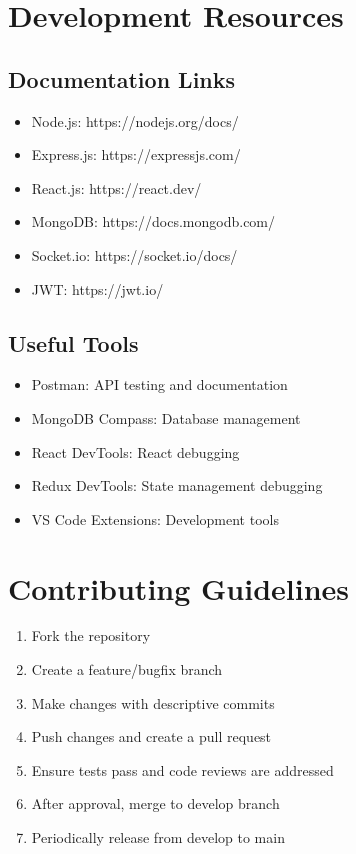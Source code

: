 \section{Development Resources}

\subsection{Documentation Links}
\begin{itemize}
    \item Node.js: https://nodejs.org/docs/
    \item Express.js: https://expressjs.com/
    \item React.js: https://react.dev/
    \item MongoDB: https://docs.mongodb.com/
    \item Socket.io: https://socket.io/docs/
    \item JWT: https://jwt.io/
\end{itemize}

\subsection{Useful Tools}
\begin{itemize}
    \item Postman: API testing and documentation
    \item MongoDB Compass: Database management
    \item React DevTools: React debugging
    \item Redux DevTools: State management debugging
    \item VS Code Extensions: Development tools
\end{itemize}

\section{Contributing Guidelines}

\begin{enumerate}
    \item Fork the repository
    \item Create a feature/bugfix branch
    \item Make changes with descriptive commits
    \item Push changes and create a pull request
    \item Ensure tests pass and code reviews are addressed
    \item After approval, merge to develop branch
    \item Periodically release from develop to main
\end{enumerate}

